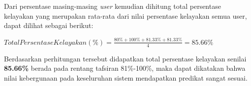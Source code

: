 	Dari persentase masing-masing \textit{user} kemudian dihitung total persentase kelayakan yang merupakan rata-rata dari nilai persentase kelayakan semua user, dapat dilihat sebagai berikut:
	
	$Total Persentase Kelayakan (\%) = \frac{80\%+ 100\% + 81.33\%+ 81.33\%}{4} = 85.66\% $
	
	Berdasarkan perhitungan tersebut didapatkan total persentase kelayakan senilai \textbf{85.66\%} berada pada rentang tafsiran 81\%-100\%,  maka dapat dikatakan bahwa nilai kebergunaan pada keseluruhan sistem mendapatkan predikat sangat sesuai. 

